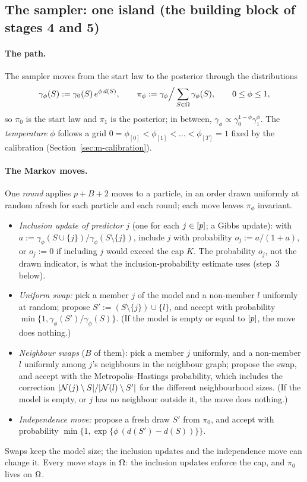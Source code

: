 \documentclass[11pt]{article}
\newcommand{\grid}[1]{\phi_{[#1]}}  %
\begin{document}
\subsection{The sampler: one island (the building block of stages 4 and 5)}\label{sec:m-island}

\paragraph{The path.} The sampler moves from the start law to the posterior through the distributions
\begin{equation}\label{eq:m-path}
  \gamma_\phi(S):=\gamma_0(S)\,e^{\phi\,d(S)},\qquad \pi_\phi:=\gamma_\phi\Big/\sum_{S\in\Omega}\gamma_\phi(S),\qquad 0\le\phi\le1,
\end{equation}
so $\pi_0$ is the start law and $\pi_1$ is the posterior; in between, $\gamma_\phi\propto\gamma_0^{1-\phi}\gamma_1^{\phi}$. The
\emph{temperature} $\phi$ follows a grid $0=\grid0<\grid1<\dots<\grid{T}=1$ fixed by the calibration
(Section~\ref{sec:m-calibration}).

\paragraph{The Markov moves.} One \emph{round} applies $p+B+2$ moves to a particle, in an order drawn uniformly at random
afresh for each particle and each round; each move leaves $\pi_\phi$ invariant.
\begin{itemize}[leftmargin=1.5em,itemsep=1pt]
  \item \emph{Inclusion update of predictor $j$} (one for each $j\in[p]$; a Gibbs update): with
    $a:=\gamma_\phi(S\cup\{j\})/\gamma_\phi(S\setminus\{j\})$, include $j$ with probability $o_j:=a/(1+a)$, or $o_j:=0$ if
    including $j$ would exceed the cap $K$. The probability $o_j$, not the drawn indicator, is what the inclusion-probability
    estimate uses (step~3 below).
  \item \emph{Uniform swap:} pick a member $j$ of the model and a non-member $l$ uniformly at random; propose
    $S':=(S\setminus\{j\})\cup\{l\}$, and accept with probability $\min\{1,\gamma_\phi(S')/\gamma_\phi(S)\}$. (If
    the model is empty or equal to $[p]$, the move does nothing.)
  \item \emph{Neighbour swaps} ($B$ of them): pick a member $j$ uniformly, and a non-member $l$ uniformly among $j$'s
    neighbours in the neighbour graph; propose the swap, and accept with the Metropolis--Hastings probability, which
    includes the correction $\lvert \mathcal N(j)\setminus S\rvert/\lvert \mathcal N(l)\setminus S'\rvert$ for the different
    neighbourhood sizes. (If the model is empty, or $j$ has no neighbour outside it, the move does nothing.)
  \item \emph{Independence move:} propose a fresh draw $S'$ from $\pi_0$, and accept with probability
    $\min\{1,\exp\{\phi\,(d(S')-d(S))\}\}$.
\end{itemize}
Swaps keep the model size; the inclusion updates and the independence move can change it. Every move stays in $\Omega$:
the inclusion updates enforce the cap, and $\pi_0$ lives on $\Omega$.
\end{document}
